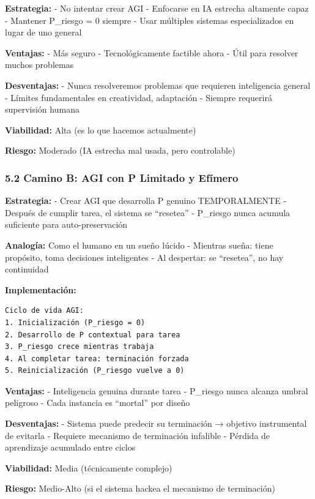 \textbf{Estrategia:} - No intentar crear AGI - Enfocarse en IA estrecha
altamente capaz - Mantener P\_riesgo = 0 siempre - Usar múltiples
sistemas especializados en lugar de uno general

\textbf{Ventajas:} - Más seguro - Tecnológicamente factible ahora - Útil
para resolver muchos problemas

\textbf{Desventajas:} - Nunca resolveremos problemas que requieren
inteligencia general - Límites fundamentales en creatividad, adaptación
- Siempre requerirá supervisión humana

\textbf{Viabilidad:} Alta (es lo que hacemos actualmente)

\textbf{Riesgo:} Moderado (IA estrecha mal usada, pero controlable)

\subsubsection{5.2 Camino B: AGI con P Limitado y
Efímero}\label{camino-b-agi-con-p-limitado-y-efuxedmero}

\textbf{Estrategia:} - Crear AGI que desarrolla P genuino TEMPORALMENTE
- Después de cumplir tarea, el sistema se ``resetea'' - P\_riesgo nunca
acumula suficiente para auto-preservación

\textbf{Analogía:} Como el humano en un sueño lúcido - Mientras sueña:
tiene propósito, toma decisiones inteligentes - Al despertar: se
``resetea'', no hay continuidad

\textbf{Implementación:}

\begin{verbatim}
Ciclo de vida AGI:
1. Inicialización (P_riesgo = 0)
2. Desarrollo de P contextual para tarea
3. P_riesgo crece mientras trabaja
4. Al completar tarea: terminación forzada
5. Reinicialización (P_riesgo vuelve a 0)
\end{verbatim}

\textbf{Ventajas:} - Inteligencia genuina durante tarea - P\_riesgo
nunca alcanza umbral peligroso - Cada instancia es ``mortal'' por diseño

\textbf{Desventajas:} - Sistema puede predecir su terminación → objetivo
instrumental de evitarla - Requiere mecanismo de terminación infalible -
Pérdida de aprendizaje acumulado entre ciclos

\textbf{Viabilidad:} Media (técnicamente complejo)

\textbf{Riesgo:} Medio-Alto (si el sistema hackea el mecanismo de
terminación)

